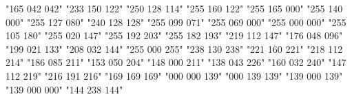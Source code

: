                    {"165 042 042"}
              {"233 150 122"}
                   {"250 128 114"}
             {"255 160 122"}
                   {"255 165 000"}
              {"255 140 000"}
                    {"255 127 080"}
              {"240 128 128"}
                   {"255 099 071"}
               {"255 069 000"}
                      {"255 000 000"}
                 {"255 105 180"}
                {"255 020 147"}
                     {"255 192 203"}
               {"255 182 193"}
          {"219 112 147"}
                   {"176 048 096"}
        {"199 021 133"}
               {"208 032 144"}
                  {"255 000 255"}
                   {"238 130 238"}
                     {"221 160 221"}
                   {"218 112 214"}
            {"186 085 211"}
              {"153 050 204"}
              {"148 000 211"}
              {"138 043 226"}
                   {"160 032 240"}
            {"147 112 219"}
                  {"216 191 216"}
                {"169 169 169"}
                {"000 000 139"}
                {"000 139 139"}
             {"139 000 139"}
                 {"139 000 000"}
              {"144 238 144"}

